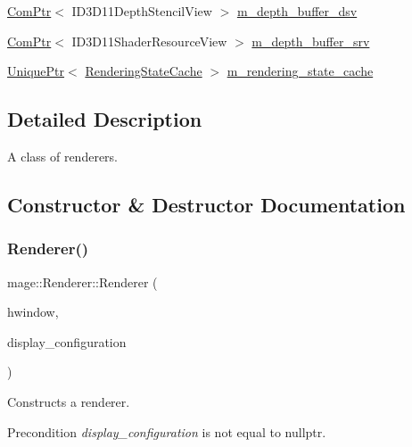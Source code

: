 \begin{DoxyCompactItemize}
\item 
\hyperlink{namespacemage_ae74f374780900893caa5555d1031fd79}{Com\+Ptr}$<$ I\+D3\+D11\+Depth\+Stencil\+View $>$ \hyperlink{classmage_1_1_renderer_a8f5a70294790d4fbbb8237c587f88bb5}{m\+\_\+depth\+\_\+buffer\+\_\+dsv}
\item 
\hyperlink{namespacemage_ae74f374780900893caa5555d1031fd79}{Com\+Ptr}$<$ I\+D3\+D11\+Shader\+Resource\+View $>$ \hyperlink{classmage_1_1_renderer_ac5b85fc464bceb434748d8a44243788c}{m\+\_\+depth\+\_\+buffer\+\_\+srv}
\item 
\hyperlink{namespacemage_a3316d7143a973e37adf1110f2e80ca31}{Unique\+Ptr}$<$ \hyperlink{structmage_1_1_rendering_state_cache}{Rendering\+State\+Cache} $>$ \hyperlink{classmage_1_1_renderer_a3d9f823ecef314a974c4cdb3a71a1853}{m\+\_\+rendering\+\_\+state\+\_\+cache}
\end{DoxyCompactItemize}


\subsection{Detailed Description}
A class of renderers. 

\subsection{Constructor \& Destructor Documentation}
\hypertarget{classmage_1_1_renderer_a63948f43587e63f5caafa2260e9dfc52}{}\label{classmage_1_1_renderer_a63948f43587e63f5caafa2260e9dfc52} 
\subsubsection{\texorpdfstring{Renderer()}{Renderer()}\hspace{0.1cm}{\footnotesize\ttfamily [1/3]}}
{\footnotesize\ttfamily mage\+::\+Renderer\+::\+Renderer (\begin{DoxyParamCaption}\item[{H\+W\+ND}]{hwindow,  }\item[{const \hyperlink{structmage_1_1_display_configuration}{Display\+Configuration} $\ast$}]{display\+\_\+configuration }\end{DoxyParamCaption})\hspace{0.3cm}{\ttfamily [explicit]}}

Constructs a renderer.

\begin{DoxyPrecond}{Precondition}
{\itshape display\+\_\+configuration} is not equal to {\ttfamily nullptr}. 
\end{DoxyPrecond}

